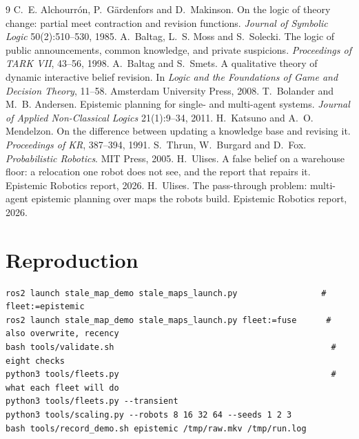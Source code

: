 \documentclass[11pt,a4paper]{article}
\theoremstyle{definition}
\begin{document}
\begin{thebibliography}{9}
 C.~E. Alchourr\'on, P.~G\"ardenfors and D.~Makinson.
On the logic of theory change: partial meet contraction and revision functions.
\emph{Journal of Symbolic Logic} 50(2):510--530, 1985.
 A.~Baltag, L.~S. Moss and S.~Solecki.
The logic of public announcements, common knowledge, and private suspicions.
\emph{Proceedings of TARK VII}, 43--56, 1998.
 A.~Baltag and S.~Smets.
A qualitative theory of dynamic interactive belief revision.
In \emph{Logic and the Foundations of Game and Decision Theory}, 11--58.
Amsterdam University Press, 2008.
 T.~Bolander and M.~B. Andersen.
Epistemic planning for single- and multi-agent systems.
\emph{Journal of Applied Non-Classical Logics} 21(1):9--34, 2011.
 H.~Katsuno and A.~O. Mendelzon.
On the difference between updating a knowledge base and revising it.
\emph{Proceedings of KR}, 387--394, 1991.
 S.~Thrun, W.~Burgard and D.~Fox.
\emph{Probabilistic Robotics}. MIT Press, 2005.
 H.~Ulises.
A false belief on a warehouse floor: a relocation one robot does not see, and
the report that repairs it. Epistemic Robotics report, 2026.
 H.~Ulises.
The pass-through problem: multi-agent epistemic planning over maps the robots
build. Epistemic Robotics report, 2026.
\end{thebibliography}

\section*{Reproduction}

\begin{lstlisting}[language={}]
ros2 launch stale_map_demo stale_maps_launch.py                 # fleet:=epistemic
ros2 launch stale_map_demo stale_maps_launch.py fleet:=fuse      # also overwrite, recency
bash tools/validate.sh                                            # eight checks
python3 tools/fleets.py                                           # what each fleet will do
python3 tools/fleets.py --transient
python3 tools/scaling.py --robots 8 16 32 64 --seeds 1 2 3
bash tools/record_demo.sh epistemic /tmp/raw.mkv /tmp/run.log
\end{lstlisting}
\end{document}
